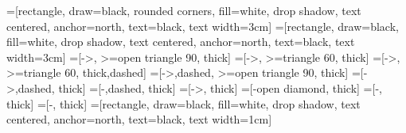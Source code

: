 
\usetikzlibrary{positioning,shapes,shadows,arrows,calc,shapes.multipart}
=[rectangle, draw=black, rounded corners, fill=white, drop shadow,
text centered, anchor=north, text=black, text width=3cm]
=[rectangle, draw=black, fill=white, drop shadow,
text centered, anchor=north, text=black, text width=3cm]
=[->, >=open triangle 90, thick]
=[->, >=triangle 60, thick]
=[->, >=triangle 60, thick,dashed]
=[->,dashed, >=open triangle 90, thick]
=[->,dashed, thick]
=[-,dashed, thick]
=[->, thick]
=[-open diamond, thick]
=[-, thick]
=[-, thick]
=[rectangle, draw=black, fill=white, drop shadow,
text centered, anchor=north, text=black, text width=1cm]
